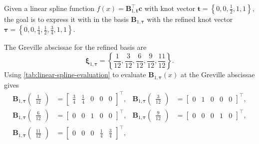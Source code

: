 \begin{indentedexample}
    Given a linear spline function $f(x) = \mathbf B_{1, \mathbf t}^\top \mathbf c$ with knot vector $\mathbf t = \left\{ 0, 0, \frac{1}{2}, 1, 1\right\}$, the goal is to express it with in the basis $\mathbf B_{1, \boldsymbol \tau}$ with the refined knot vector $\boldsymbol \tau = \left\{ 0, 0, \frac{1}{4}, \frac{1}{2}, \frac{3}{4}, 1, 1\right\}$.

        The Greville abscissae for the refined basis are
        \begin{equation*}
            \boldsymbol \xi_{1,\boldsymbol \tau} = 
            \left\{
                \frac{1}{12}, \frac{3}{12}, \frac{6}{12}, \frac{9}{12}, \frac{11}{12}
            \right\}.
        \end{equation*}
        Using \cref{tab:linear-spline-evaluation} to evaluate $\mathbf B_{1,\boldsymbol\tau}(x)$ at the Greville abscissae gives
        \begin{equation*}
            \begin{aligned}
                \mathbf B_{1, \boldsymbol\tau}\begin{pmatrix}\frac{1}{12}\end{pmatrix} &= \begin{bmatrix} \frac{3}{4} & \frac{1}{4} & 0 & 0 & 0 \end{bmatrix}^\top,
                &\mathbf B_{1, \boldsymbol\tau}\begin{pmatrix}\frac{3}{12}\end{pmatrix} &= \begin{bmatrix} 0 & 1 & 0 & 0 & 0 \end{bmatrix}^\top, \\
                \mathbf B_{1, \boldsymbol\tau}\begin{pmatrix}\frac{6}{12}\end{pmatrix} &= \begin{bmatrix} 0 & 0 & 1 & 0 & 0 \end{bmatrix}^\top,
                &\mathbf B_{1, \boldsymbol\tau}\begin{pmatrix}\frac{9}{12}\end{pmatrix} &= \begin{bmatrix} 0 & 0 & 0 & 1 & 0 \end{bmatrix}^\top, \\
                \mathbf B_{1, \boldsymbol\tau}\begin{pmatrix}\frac{11}{12}\end{pmatrix} &= \begin{bmatrix} 0 & 0 & 0 & \frac{1}{4} & \frac{3}{4} \end{bmatrix}^\top,

\end{aligned}
\end{equation*}
\end{indentedexample}
